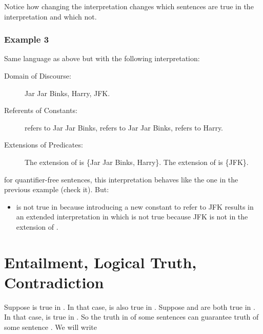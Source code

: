 Notice how changing the interpretation changes which sentences are true in the interpretation and 
which not.



\subsubsection*{Example 3}

Same language as above but with the following interpretation:

\begin{description}

 \item[Domain of Discourse:] Jar Jar Binks, Harry, JFK.

 \item[Referents of Constants:]  refers to Jar Jar Binks,  refers to 
  Jar Jar Binks,  refers to Harry.

 \item[Extensions of Predicates:] The extension of  is \{Jar Jar Binks, 
  Harry\}. The extension of  is \{JFK\}.

\end{description}

for quantifier-free sentences, this interpretation behaves like the one in the previous 
example (check it). But:

\begin{itemize}

 \item {} is not true in \model{}  because introducing a new 
  constant  to refer to JFK results in an extended interpretation 
  in which  is not true  because JFK is not in the extension of 
  .

\end{itemize}



\section{Entailment, Logical Truth, Contradiction}

Suppose  is true in \model. In that case,  is also true in \model. Suppose  and 
 are both true in \model. In that case,  
is true in \model. So the truth in \model{} of some sentences can guarantee 
truth of some sentence \p{\phi}. We will write

